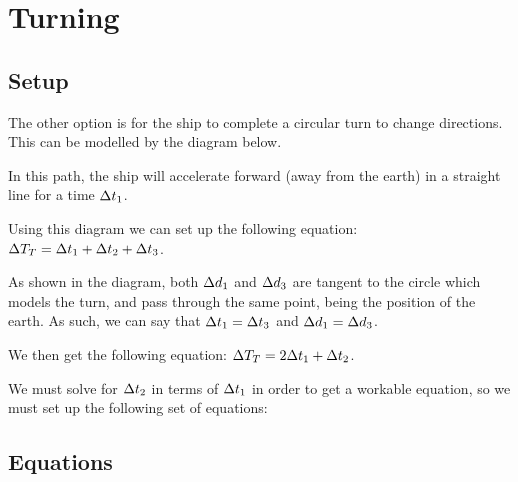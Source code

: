 \section{Turning}
	\subsection{Setup}
		The other option is for the ship to complete a circular turn to change directions.
		This can be modelled by the diagram below.
		
		In this path, the ship will accelerate forward (away from the earth) in a straight line for a time $\mathrm{\Delta} t_1$.

		Using this diagram we can set up the following equation: $\mathrm{\Delta} T_T = \mathrm{\Delta} t_1 + \mathrm{\Delta} t_2 + \mathrm{\Delta} t_3$.

		As shown in the diagram, both $\mathrm{\Delta} d_1$ and $\mathrm{\Delta} d_3$ are tangent to the circle which models the turn, and pass through the same point, being the position of the earth.
		As such, we can say that $\mathrm{\Delta} t_1 = \mathrm{\Delta} t_3$ and $\mathrm{\Delta} d_1 = \mathrm{\Delta} d_3$.

		We then get the following equation: $\mathrm{\Delta} T_T = 2\mathrm{\Delta} t_1 + \mathrm{\Delta} t_2$.

		We must solve for $\mathrm{\Delta} t_2$ in terms of $\mathrm{\Delta} t_1$ in order to get a workable equation, so we must set up the following set of 
		equations:
	\subsection{Equations}
